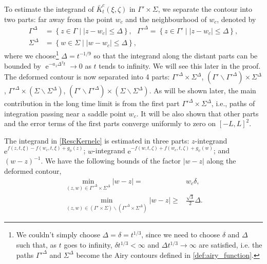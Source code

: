 \documentclass[cmp]{svjour}
\numberwithin{theorem}{section}
\numberwithin{equation}{section}
\DeclareMathOperator{\e}{e}
\begin{document}
To estimate the integrand of $\bar{K}_t^{c } (\xi , \zeta)$ in $\Gamma' \times \Sigma$, we separate the contour into two parts: far away from the point $w_c$ and the neighbourhood of $w_c$, denoted by 
\begin{align}
	\Gamma^{\Delta} &= \left\{ z \in \Gamma \middle| | z - w_c | \leq \Delta  \right\},\,\,\,\,
	\Gamma'^{\Delta} = \left\{ z \in \Gamma' \middle| | z - w_c | \leq \Delta  \right\}, \label{gamma_prime_Delta} \\
	\Sigma^{\Delta} & = \left\{ w \in \Sigma \middle| | w - w_c| \leq \Delta  \right\},
\end{align} 
where we choose\footnote{We couldn't simply choose $\Delta = \delta = t^{1/3}$, since we need to choose $\delta$ and $\Delta$ such that, as $t$ goes to infinity, $\delta t^{1/3} < \infty$ and $\Delta t^{1/3} \rightarrow \infty$ are satisfied, i.e. the paths $\Gamma'^\Delta$ and $\Sigma^\Delta$ become the Airy contours defined in \eqref{def:airy_function}.} $\Delta=t^{-1/9}$ so that the integrand along the distant parts can be bounded by $\e^{-a_1 \Delta^3 t} \rightarrow 0$ as $t$ tends to infinity. We will see this later in the proof. The deformed contour is now separated into 4 parts: $\Gamma'^{\Delta} \times \Sigma^{\Delta}$, $(\Gamma' \backslash \Gamma'^{\Delta}) \times \Sigma^{\Delta}$, $\Gamma'^{\Delta} \times (\Sigma \backslash \Sigma^{\Delta})$, $(\Gamma' \backslash \Gamma'^{\Delta}) \times  (\Sigma \backslash \Sigma^{\Delta})$. As will be shown later, the main contribution in the long time limit is from the first part $\Gamma'^{\Delta} \times \Sigma^{\Delta}$, i.e., paths of integration passing near a saddle point $w_c$. It will be also shown that other parts and the error terms of the first parts converge uniformly to zero on $ {[-L , L]}^2$.


The integrand in \eqref{RescKernelc} is estimated in three parts: $z$-integrand $\mathrm{e}^{ f(z, t,\xi) - f(w_c , t, \xi) + g_{\phi}(z) }$; $w$-integrand $\mathrm{e}^{ - f(w, t,\zeta) + f(w_c , t, \zeta) + g_{\psi}(w) }$; and $(w-z)^{-1}$. We have the following bounds of the factor $|w-z|$ along the deformed contour,
\begin{subequations}
	\begin{align}\label{Minimum|w-z|}
		\underset{ (z , w) \in \Gamma'^{\Delta} \times \Sigma^{\Delta} }{\min}{ | w - z | } =& w_c \delta,\\
		\underset{ (z , w) \in (\Gamma' \times \Sigma) \backslash (\Gamma'^{\Delta} \times \Sigma^{\Delta}) }{\min}{ | w - z | } \geq & \frac{\sqrt{3}}{2} \Delta. \label{Minimum|w-z|_2} 
	\end{align}
\end{subequations}
\end{document}
